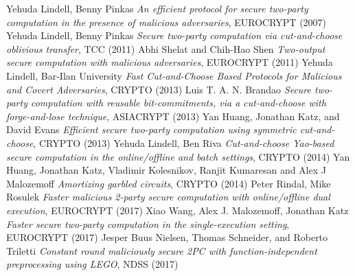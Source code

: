 \begin{thebibliography}{99}

 Yehuda Lindell, Benny Pinkas \emph{An efficient protocol for secure two-party computation in the presence of malicious adversaries}, {EUROCRYPT} (2007)
 Yehuda Lindell, Benny Pinkas \emph{Secure two-party computation via cut-and-choose oblivious transfer}, {TCC} (2011)
 Abhi Shelat and Chih-Hao Shen \emph{Two-output secure computation with malicious adversaries}, {EUROCRYPT} (2011)
 Yehuda Lindell, Bar-Ilan University \emph{Fast Cut-and-Choose Based Protocols for Malicious and Covert Adversaries}, {CRYPTO} (2013)
 Luis T. A. N. Brandao \emph{Secure two-party computation with reusable bit-commitments, via a cut-and-choose with forge-and-lose technique}, {ASIACRYPT} (2013)
 Yan Huang, Jonathan Katz, and David Evans \emph{Efficient secure two-party computation using symmetric cut-and-choose}, {CRYPTO} (2013)
 Yehuda Lindell, Ben Riva \emph{Cut-and-choose Yao-based secure computation in the online/offline and batch settings}, {CRYPTO} (2014)
 Yan Huang, Jonathan Katz, Vladimir Kolesnikov, Ranjit Kumaresan and Alex J Malozemoff \emph{Amortizing garbled circuits}, {CRYPTO} (2014)
 Peter Rindal, Mike Rosulek \emph{Faster malicious 2-party secure computation with online/offline dual execution}, {EUROCRYPT} (2017)
 Xiao Wang, Alex J. Malozemoff, Jonathan Katz \emph{Faster secure two-party computation in the single-execution setting}, {EUROCRYPT} (2017)
 Jesper Buus Nielsen, Thomas Schneider, and Roberto Triletti \emph{Constant round maliciously
secure 2PC with function-independent preprocessing using LEGO}, {NDSS} (2017)

\end{thebibliography}

%

